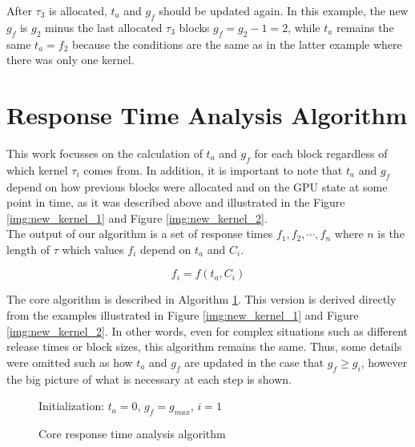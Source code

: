 \documentclass[
  12pt,
  a4paperpaper,
]{report}
\begin{document}
After \(\tau_3\) is allocated, \(t_a\) and \(g_f\) should be updated again. In
this example, the new \(g_f\) is  \(g_2\) minus the last
allocated \(\tau_3\) blocks \(g_f = g_2 - 1 = 2\), while \(t_a\) remains the
same \(t_a = f_2\) because the conditions are the same as in the latter
example where there was only one kernel.

\hypertarget{response-time-analysis-algorithm}{%
\section{Response Time Analysis
Algorithm}\label{response-time-analysis-algorithm}}

This work focusses on the calculation of \(t_a\) and \(g_f\) for
each block regardless of which kernel \(\tau_i\) comes from. In addition, it is
important to note that \(t_a\) and \(g_f\) depend on how previous
blocks were allocated and on the GPU state at some point in time, as it
was described above and illustrated in the Figure \ref{img:new_kernel_1}
and Figure \ref{img:new_kernel_2}.\\
The output of our algorithm is a set of response times
\({f_1, f_2, \cdots, f_n}\) where \(n\) is the length of \(\tau\) which
values \(f_i\) depend on \(t_a\) and \(C_i\).

\begin{equation}
f_i = f(t_a, C_i)
\end{equation}

The core algorithm is described in Algorithm \ref{alg:basic}. 
This version is derived directly from the examples
illustrated in Figure \ref{img:new_kernel_1} and Figure
\ref{img:new_kernel_2}.
In other words, even for complex situations such as different release times or block sizes, this algorithm remains the same.
Thus, some details were omitted such as how \(t_a\) and \(g_f\) are updated in the case that \(g_f \geq g_i\), however the big picture of what is necessary at each step is shown.

\begin{figure}[ht]
\centering
\begin{minipage}{.7\linewidth}
    \begin{algorithm}[H]
        \DontPrintSemicolon
        \SetAlgoLined
        \Input{$\tau$}
        \BlankLine
        Initialization: $t_a = 0$, $g_f = g_{max}$, $i=1$ \\
        \caption{Core response time analysis algorithm }
        \label{alg:basic}
    \end{algorithm} 
  \end{minipage}
\end{figure}
\end{document}
